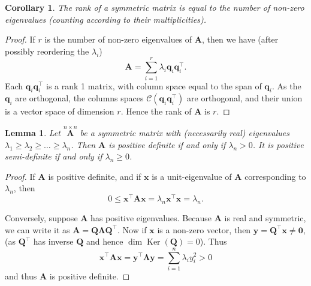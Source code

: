 \documentclass[]{book}
\newtheorem{lemma}{Lemma}[chapter]
\newtheorem{corollary}{Corollary}[chapter]
\theoremstyle{definition}
\theoremstyle{definition}
\theoremstyle{definition}
\theoremstyle{remark}
\begin{document}
\begin{corollary}
\protect\hypertarget{cor:nonzeroeigen}{}{\label{cor:nonzeroeigen} }The rank of a symmetric matrix is equal to the number of non-zero eigenvalues (counting according to their multiplicities).
\end{corollary}
\begin{proof}
{}If \(r\) is the number of non-zero eigenvalues of \(\boldsymbol A\), then we have (after possibly reordering the \(\lambda_i\))
\[{\mathbf A}= \sum _{i=1}^{r} \lambda _i {\mathbf q}_i {\mathbf q}_i^\top. \]
Each \({\mathbf q}_i {\mathbf q}_i^\top\) is a rank 1 matrix, with column space equal to the span of \(\boldsymbol q_i\). As the \(\boldsymbol q_i\) are orthogonal, the columns spaces \(\mathcal{C}(\boldsymbol q_i \boldsymbol q_i^\top)\) are orthogonal, and their union
is a vector space of dimension \(r\). Hence the rank of \(\boldsymbol A\) is \(r\).
\end{proof}

\begin{lemma}
\protect\hypertarget{lem:eigposdef}{}{\label{lem:eigposdef} }Let \(\stackrel{n\times n}{\mathbf A}\) be a symmetric matrix
with (necessarily real) eigenvalues \(\lambda _1 \geq \lambda _2 \geq \dots \geq \lambda _n\). Then \(\mathbf A\) is \emph{positive definite}
if and only if \(\lambda _n >0\). It is positive semi-definite if and only if \(\lambda_n \geq 0\).
\end{lemma}
\begin{proof}
{}If \(\boldsymbol A\) is positive definite, and if \(\boldsymbol x\) is a unit-eigenvalue of \(\boldsymbol A\) corresponding to \(\lambda_n\), then
\[0\leq \boldsymbol x^\top \boldsymbol A\boldsymbol x= \lambda_n \boldsymbol x^\top \boldsymbol x= \lambda_n.\]

Conversely, suppose \(\boldsymbol A\) has positive eigenvalues. Because \(\boldsymbol A\) is real and symmetric, we can write it as \(\boldsymbol A=\boldsymbol Q{\mathbf\Lambda} \boldsymbol Q^\top\). Now if \(\boldsymbol x\) is a non-zero vector, then \(\boldsymbol y= \boldsymbol Q^\top \boldsymbol x\not= \boldsymbol 0\), (as \(\boldsymbol Q^\top\) has inverse \(\boldsymbol Q\) and hence \(\dim \operatorname{Ker}(\boldsymbol Q)=0\)). Thus
\[\boldsymbol x^\top \boldsymbol A\boldsymbol x= \boldsymbol y^\top {\mathbf\Lambda}\boldsymbol y= \sum_{i=1}^n \lambda_i y_i^2 >0\] and thus \(\boldsymbol A\) is positive definite.
\end{proof}
\end{document}
